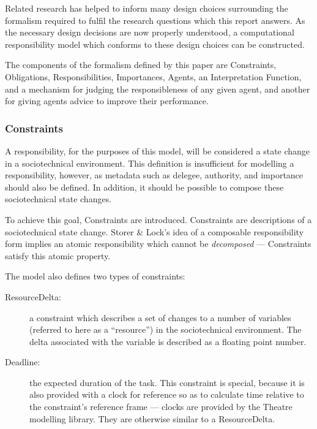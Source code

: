 Related research has helped to inform many design choices surrounding the formalism required to fulfil the research questions which this report answers. As the necessary design decisions are now properly understood, a computational responsibility model which conforms to these design choices can be constructed.\par

The components of the formalism defined by this paper are Constraints, Obligations, Responsibilities, Importances, Agents, an Interpretation Function, and a mechanism for judging the responsibleness of any given agent, and another for giving agents advice to improve their performance.\par

\subsubsection{Constraints}  %
A responsibility, for the purposes of this model, will be considered a state change in a sociotechnical environment. This definition is insufficient for modelling a responsibility, however, as metadata such as delegee, authority, and importance should also be defined. In addition, it should be possible to compose these sociotechnical state changes.\par

To achieve this goal, Constraints are introduced. Constraints are descriptions of a sociotechnical state change. Storer \& Lock's idea of a composable responsibility form implies an atomic responsibility which cannot be \emph{decomposed} --- Constraints satisfy this atomic property.\par

The model also defines two types of constraints:

\begin{description}
    \item [ResourceDelta: ] a constraint which describes a set of changes to a number of variables (referred to here as a ``resource'') in the sociotechnical environment. The delta associated with the variable is described as a floating point number.
    \item [Deadline: ] the expected duration of the task. This constraint is special, because it is also provided with a clock for reference so as to calculate time relative to the constraint's reference frame --- clocks are provided by the Theatre modelling library\cite{theatre_code}. They are otherwise similar to a ResourceDelta.
\end{description}

